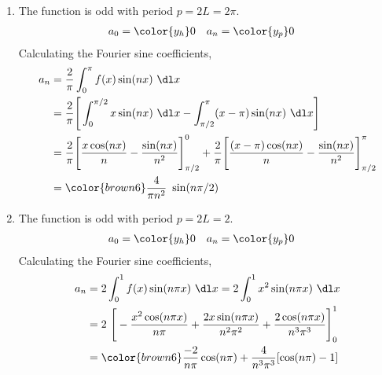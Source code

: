 \begin{enumerate}
    \item The function is odd with period $ p = 2L = 2\pi $.
          \begin{align}
              a_0 & = \color{y_h} 0 &
              a_n & = \color{y_p} 0
          \end{align}
          Calculating the Fourier sine coefficients,
          \begin{align}
              a_n & = \frac{2}{\pi} \int_{0}^{\pi} f(x) \sin(nx)\ \dl x               \\
                  & = \frac{2}{\pi} \Bigg[ \int_{0}^{\pi/2} x \sin(nx)\ \dl x
              - \int_{\pi/2}^{\pi} (x-\pi) \sin(nx)\ \dl x \Bigg]                     \\
                  & = \frac{2}{\pi} \Bigg[ \frac{x\cos(nx)}{n} - \frac{\sin(nx)}{n^2}
                  \Bigg]_{\pi/2}^{0} + \frac{2}{\pi} \Bigg[
              \frac{(x-\pi)\cos(nx)}{n} - \frac{\sin(nx)}{n^2} \Bigg]_{\pi/2}^{\pi}   \\
                  & = \color{brown6} \frac{4}{\pi n^2}\ \sin(n\pi/2)
          \end{align}

    \item The function is odd with period $ p = 2L = 2 $.
          \begin{align}
              a_0 & = \color{y_h} 0 &
              a_n & = \color{y_p} 0
          \end{align}
          Calculating the Fourier sine coefficients,
          \begin{align}
              a_n & = 2 \int_{0}^{1} f(x) \sin(n\pi x)\ \dl x
              = 2 \int_{0}^{1} x^2 \sin(n\pi x)\ \dl x                                \\
                  & = 2\ \Bigg[ -\frac{x^2 \cos(n\pi x)}{n\pi}
                  + \frac{2x\sin(n\pi x)}{n^2 \pi^2}
              + \frac{2\cos(n\pi x)}{n^3 \pi^3}\Bigg]_0^1                             \\
                  & = \color{brown6} \frac{-2}{n\pi} \cos(n\pi) + \frac{4}{n^3 \pi^3}
              [\cos(n\pi) - 1]
          \end{align}


\end{enumerate}
